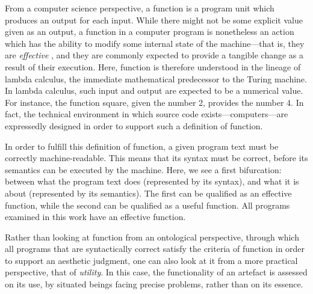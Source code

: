 
From a computer science perspective, a function is a program unit which produces an output for each input. While there might not be some explicit value given as an output, a function in a computer program is nonetheless an action which has the ability to modify some internal state of the machine—that is, they are \emph{effective} \citep{abelson_structure_1979}, and they are commonly expected to provide a tangible change as a result of their execution. Here, function is therefore understood in the lineage of lambda calculus, the immediate mathematical predecessor to the Turing machine. In lambda calculus, such input and output are expected to be a numerical value. For instance, the function square, given the number 2, provides the number 4. In fact, the technical environment in which source code exists—computers—are expressedly designed in order to support such a definition of function.

In order to fulfill this definition of function, a given program text must be correctly machine-readable. This means that its syntax must be correct, before its semantics can be executed by the machine. Here, we see a first bifurcation: between what the program text does (represented by its syntax), and what it is about (represented by its semantics). The first can be qualified as an effective function, while the second can be qualified as a useful function. All programs examined in this work have an effective function.

Rather than looking at function from an ontological perspective, through which all programs that are syntactically correct satisfy the criteria of function in order to support an aesthetic judgment, one can also look at it from a more practical perspective, that of \emph{utility}. In this case, the functionality of an artefact is assessed on its use, by situated beings facing precise problems, rather than on its essence.

